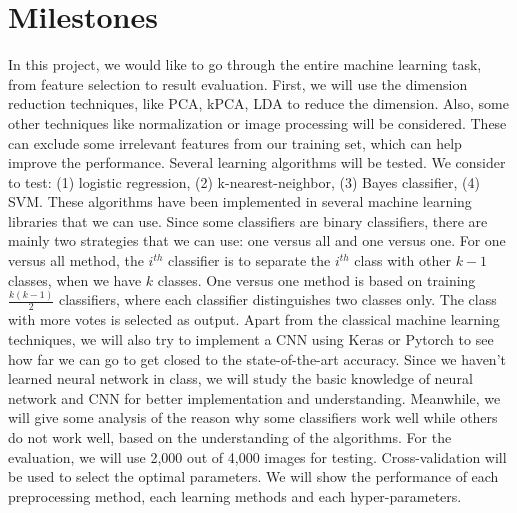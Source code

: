 \documentclass[12pt]{article}
\begin{document}
\section{\fontsize{12}{12}\selectfont Milestones}
In this project, we would like to go through the entire machine learning task, from feature selection to result evaluation. First, we will use the dimension reduction techniques, like PCA, kPCA, LDA to reduce the dimension. Also, some other techniques like normalization or image processing will be considered. These can exclude some irrelevant features from our training set, which can help improve the performance. Several learning algorithms will be tested. We consider to test: (1) logistic regression, (2) k-nearest-neighbor, (3) Bayes classifier, (4) SVM. These algorithms have been implemented in several machine learning libraries that we can use. Since some classifiers are binary classifiers, there are mainly two strategies that we can use: one versus all and one versus one. For one versus all method, the $i^{th}$ classifier is to separate the $i^{th}$ class with other $k-1$ classes, when we have $k$ classes. One versus one method is based on training $\frac{k(k-1)}{2}$ classifiers, where each classifier distinguishes two classes only. The class with more votes is selected as output. Apart from the classical machine learning techniques, we will also try to implement a CNN using Keras or Pytorch to see how far we can go to get closed to the state-of-the-art accuracy. Since we haven't learned neural network in class, we will study the basic knowledge of neural network and CNN for better implementation and understanding. Meanwhile, we will give some analysis of the reason why some classifiers work well while others do not work well, based on the understanding of the algorithms. For the evaluation, we will use 2,000 out of 4,000 images for testing. Cross-validation will be used to select the optimal parameters. We will show the performance of each preprocessing method, each learning methods and each hyper-parameters.


\end{document}
